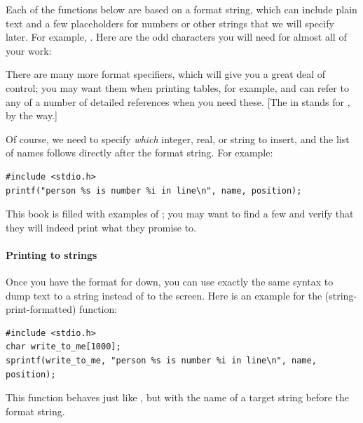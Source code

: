 \documentclass[12pt]{article}
\makeatletter
\def\cind#1{\index{#1@\cinline{#1}}\cinline{#1}}
\makeatother
\begin{document}
Each of the functions below are based on a format string, which
can include plain text and a few placeholders for numbers or other
strings that we will specify later. For example, .  Here are the odd characters you
will need for almost all of your work:

\startonecol
\begin{center}
\end{center}
\endonecol

There are many more format specifiers, which will give you a great deal of control; you may want
them when printing tables, for example, and can refer to any of a number of detailed references when you
need these. [The  in  stands for , by the way.]

Of course, we need to specify {\sl which} integer, real, or string to insert, and the list of names
follows directly after the format string. For example:
\begin{lstlisting}
#include <stdio.h>
printf("person %s is number %i in line\n", name, position);
\end{lstlisting}
This book is filled with examples of \cind{printf}; you may want to find a few and
verify that they will indeed print what they promise to.

\paragraph{Printing to strings} Once you have the format for  down, you can use exactly the
same syntax to dump text to a string instead of to the screen. Here is an example for the 
(string-print-formatted) function:
\begin{lstlisting}
#include <stdio.h>
char write_to_me[1000];
sprintf(write_to_me, "person %s is number %i in line\n", name, position);
\end{lstlisting}
This function behaves just like , but with the name of
a target string before the format string. 
\end{document}
